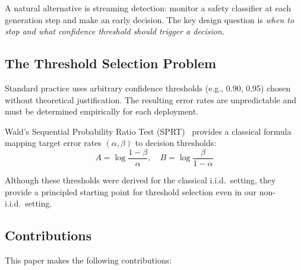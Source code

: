 \documentclass[acmtjournal, acmnowidth]{acmart}
\theoremstyle{definition}
\begin{document}
A natural alternative is streaming detection: monitor a safety classifier at each generation step and make an early decision. The key design question is \textit{when to stop and what confidence threshold should trigger a decision.}

\subsection{The Threshold Selection Problem}

Standard practice uses arbitrary confidence thresholds (e.g., 0.90, 0.95) chosen without theoretical justification. The resulting error rates are unpredictable and must be determined empirically for each deployment.

Wald's Sequential Probability Ratio Test (SPRT)~\cite{wald1945} provides a classical formula mapping target error rates $(\alpha, \beta)$ to decision thresholds:
\begin{equation}
A = \log\frac{1-\beta}{\alpha}, \quad B = \log\frac{\beta}{1-\alpha}
\label{eq:wald_thresholds_intro}
\end{equation}

Although these thresholds were derived for the classical i.i.d.\ setting, they provide a principled starting point for threshold selection even in our non-i.i.d.\ setting.

\subsection{Contributions}

This paper makes the following contributions:
\end{document}
